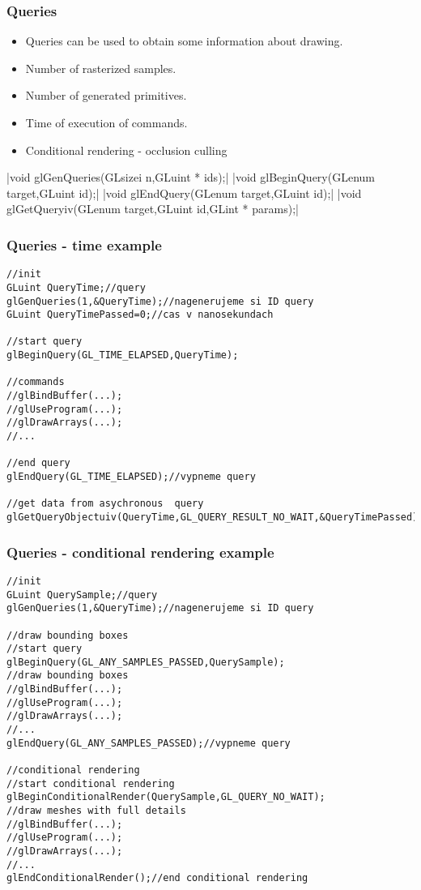\begin{frame}
\frametitle{Queries}
	\begin{itemize}
	\item Queries can be used to obtain some information about drawing.
	\item Number of rasterized samples.
	\item Number of generated primitives.
	\item Time of execution of commands.
	\item Conditional rendering - occlusion culling
	\end{itemize}
	{\scriptsize
	|void glGenQueries(GLsizei n,GLuint * ids);|
	|void glBeginQuery(GLenum target,GLuint id);|
	|void glEndQuery(GLenum target,GLuint id);|
	|void glGetQueryiv(GLenum target,GLuint id,GLint * params);|
	}
\end{frame}

\begin{frame}[fragile]
\frametitle{Queries - time example}
	{\scriptsize
	\begin{verbatim}
//init
GLuint QueryTime;//query
glGenQueries(1,&QueryTime);//nagenerujeme si ID query
GLuint QueryTimePassed=0;//cas v nanosekundach

//start query
glBeginQuery(GL_TIME_ELAPSED,QueryTime);

//commands
//glBindBuffer(...);
//glUseProgram(...);
//glDrawArrays(...);
//...

//end query
glEndQuery(GL_TIME_ELAPSED);//vypneme query

//get data from asychronous  query
glGetQueryObjectuiv(QueryTime,GL_QUERY_RESULT_NO_WAIT,&QueryTimePassed);
	\end{verbatim}
	}
\end{frame}

\begin{frame}[fragile]
\frametitle{Queries - conditional rendering example}
	{\scriptsize
	\begin{verbatim}
//init
GLuint QuerySample;//query
glGenQueries(1,&QueryTime);//nagenerujeme si ID query

//draw bounding boxes
//start query
glBeginQuery(GL_ANY_SAMPLES_PASSED,QuerySample);
//draw bounding boxes 
//glBindBuffer(...);
//glUseProgram(...);
//glDrawArrays(...);
//...
glEndQuery(GL_ANY_SAMPLES_PASSED);//vypneme query

//conditional rendering
//start conditional rendering
glBeginConditionalRender(QuerySample,GL_QUERY_NO_WAIT);
//draw meshes with full details
//glBindBuffer(...);
//glUseProgram(...);
//glDrawArrays(...);
//...
glEndConditionalRender();//end conditional rendering
	\end{verbatim}
	}
\end{frame}

